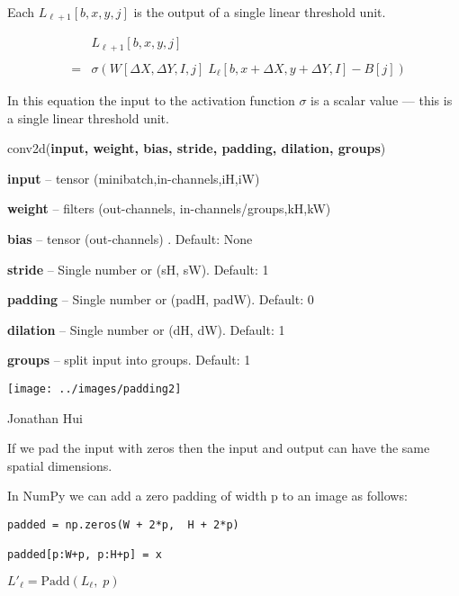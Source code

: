 {

Each $L_{{\ell+1}}[b,x,y,j]$ is the output of a single linear threshold unit.

\bigskip
\begin{eqnarray*}
 & &  L_{{\ell+1}}[b,x,y,j] \\
 \\
  & = &   \sigma\left(W[\Delta X, \Delta Y, I,j]\; L_{{\ell}}[b,x + \Delta X, y + \Delta Y, I] - B[j]\right)
\end{eqnarray*}

\vfill
In this equation the input to the activation function $\sigma$ is a scalar value --- this is a single linear threshold unit.


conv2d({\bf input, weight, bias, stride, padding, dilation, groups})

\bigskip
{\bf input} – tensor (minibatch,in-channels,iH,iW)

\medskip
{\bf weight} – filters (out-channels, in-channels/groups,kH,kW)

\medskip
{\bf bias} – tensor (out-channels) . Default: None

\medskip
{\bf stride} – Single number or (sH, sW). Default: 1

\medskip
{\bf padding} – Single number or (padH, padW). Default: 0

\medskip
{\bf dilation} – Single number or (dH, dW). Default: 1

\medskip
{\bf groups} – split input into groups. Default: 1


\centerline{\texttt{[image: ../images/padding2]}}
\centerline{\large Jonathan Hui}

\vfill
If we pad the input with zeros then the input and output can have the same spatial dimensions.


In NumPy we can add a zero padding of width p to an image as follows:

\vfill
\begin{verbatim}
padded = np.zeros(W + 2*p,  H + 2*p)

padded[p:W+p, p:H+p] = x
\end{verbatim}


$L'_{{\ell}} = \mathrm{Padd}(L_{{\ell}},\;p)$

}
